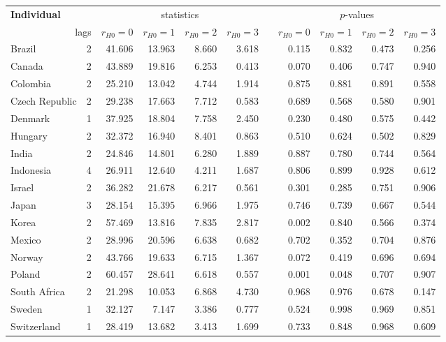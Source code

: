 \begin{tabular}{lrrrrrrrrrr}
	\hline \hline
	\multicolumn{2}{l}{ \textbf{Individual} } & \multicolumn{4}{c}{ statistics } &  & \multicolumn{4}{c}{ $ p $-values } \\
	\cline{3-6} \cline{8-11}
	\multicolumn{2}{r}{ lags } & $ r_{H0} = 0 $ & $ r_{H0} = 1 $ & $ r_{H0} = 2 $ & $ r_{H0} = 3 $ &   & $ r_{H0} = 0 $ & $ r_{H0} = 1 $ & $ r_{H0} = 2 $ & $ r_{H0} = 3 $ \\
	\hline
	Brazil & 2 & 41.606 & 13.963 &  8.660 &  3.618 &   & 0.115 & 0.832 & 0.473 & 0.256 \\
	Canada & 2 & 43.889 & 19.816 &  6.253 &  0.413 &   & 0.070 & 0.406 & 0.747 & 0.940 \\
	Colombia & 2 & 25.210 & 13.042 &  4.744 &  1.914 &   & 0.875 & 0.881 & 0.891 & 0.558 \\
	Czech Republic & 2 & 29.238 & 17.663 &  7.712 &  0.583 &   & 0.689 & 0.568 & 0.580 & 0.901 \\
	Denmark & 1 & 37.925 & 18.804 &  7.758 &  2.450 &   & 0.230 & 0.480 & 0.575 & 0.442 \\
	Hungary & 2 & 32.372 & 16.940 &  8.401 &  0.863 &   & 0.510 & 0.624 & 0.502 & 0.829 \\
	India & 2 & 24.846 & 14.801 &  6.280 &  1.889 &   & 0.887 & 0.780 & 0.744 & 0.564 \\
	Indonesia & 4 & 26.911 & 12.640 &  4.211 &  1.687 &   & 0.806 & 0.899 & 0.928 & 0.612 \\
	Israel & 2 & 36.282 & 21.678 &  6.217 &  0.561 &   & 0.301 & 0.285 & 0.751 & 0.906 \\
	Japan & 3 & 28.154 & 15.395 &  6.966 &  1.975 &   & 0.746 & 0.739 & 0.667 & 0.544 \\
	Korea & 2 & 57.469 & 13.816 &  7.835 &  2.817 &   & 0.002 & 0.840 & 0.566 & 0.374 \\
	Mexico & 2 & 28.996 & 20.596 &  6.638 &  0.682 &   & 0.702 & 0.352 & 0.704 & 0.876 \\
	Norway & 2 & 43.766 & 19.633 &  6.715 &  1.367 &   & 0.072 & 0.419 & 0.696 & 0.694 \\
	Poland & 2 & 60.457 & 28.641 &  6.618 &  0.557 &   & 0.001 & 0.048 & 0.707 & 0.907 \\
	South Africa & 2 & 21.298 & 10.053 &  6.868 &  4.730 &   & 0.968 & 0.976 & 0.678 & 0.147 \\
	Sweden & 1 & 32.127 &  7.147 &  3.386 &  0.777 &   & 0.524 & 0.998 & 0.969 & 0.851 \\
	Switzerland & 1 & 28.419 & 13.682 &  3.413 &  1.699 &   & 0.733 & 0.848 & 0.968 & 0.609 \\

\end{tabular}
